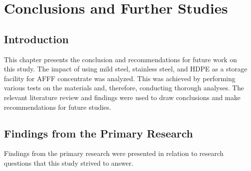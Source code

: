 \documentclass[12pt]{report}
\begin{document}
\chapter{Conclusions and Further Studies}
\section{Introduction}
This chapter presents the conclusion and recommendations for future work on this study. The impact of using mild steel, stainless steel, and HDPE as a storage facility for AFFF concentrate was analyzed. This was achieved by performing various tests on the materials and, therefore, conducting thorough analyses. The relevant literature review and findings were used to draw conclusions and make recommendations for future studies.

\section{Findings from the Primary Research}
Findings from the primary research were presented in relation to research questions that this study strived to answer.
\end{document}
